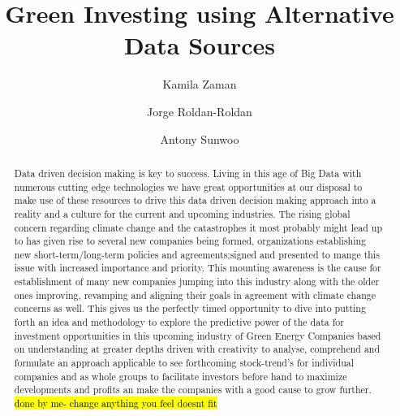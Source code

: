 \documentclass[sigconf, nonacm]{acmart}
\begin{document}
\title{Green Investing using Alternative Data Sources}

\author{Kamila Zaman}

\author{Jorge Roldan-Roldan}

\author{Antony Sunwoo}

\begin{abstract} Data driven decision making is key to success. Living in this age of Big Data with numerous cutting edge technologies we have great opportunities at our disposal to make use of these resources to drive this data driven decision making approach into a reality and a culture for the current and upcoming industries. The rising global concern regarding climate change and the catastrophes it most probably might lead up to has given rise to several new companies being formed, organizations establishing new short-term/long-term policies and agreements;signed and presented to mange this issue with increased importance and priority. This mounting awareness is the cause for establishment of many new companies jumping into this industry along with the older ones improving, revamping and aligning their goals in agreement with climate change concerns as well. This gives us the perfectly timed opportunity to dive into putting forth an idea and methodology to explore the predictive power of the data for investment opportunities in this upcoming industry of Green Energy Companies based on understanding at greater depths driven with creativity to analyse, comprehend and formulate an approach applicable to see forthcoming stock-trend's for individual companies and as whole groups to facilitate investors before hand to maximize developments and profits an make the companies with a good cause to grow further. 
\hl{done by me- change anything you feel doesnt fit}

\end{abstract}
\end{document}
